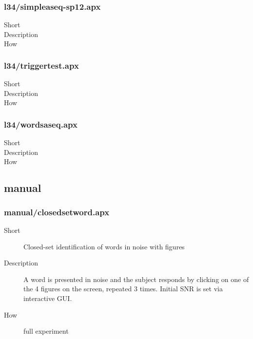 \subsubsection{l34/simpleaseq-sp12.apx}
\begin{description}
\item[Short] 

\item[Description] 

\item[How] 

\end{description}

\subsubsection{l34/triggertest.apx}
\begin{description}
\item[Short] 

\item[Description] 

\item[How] 

\end{description}

\subsubsection{l34/wordsaseq.apx}
\begin{description}
\item[Short] 

\item[Description] 

\item[How] 

\end{description}

\subsection{manual}
\subsubsection{manual/closedsetword.apx}
\begin{description}
\item[Short] 
 Closed-set identification of words in noise with figures
\item[Description] 
 A word is presented in noise and the subject responds by clicking on one of the 4 figures on the screen, repeated 3 times. Initial SNR is set via interactive GUI.
\item[How] 
 full experiment
\end{description}

